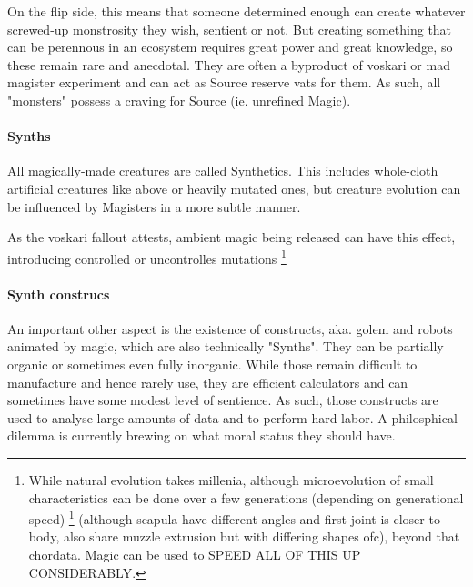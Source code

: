 On the flip side, this means that someone determined enough can create whatever screwed-up monstrosity they wish, sentient or not. But creating something that can be perennous in an ecosystem requires great power and great knowledge, so these remain rare and anecdotal. They are often a byproduct of voskari or mad magister experiment and can act as Source reserve vats for them. As such, all "monsters" possess a craving for Source (ie. unrefined Magic).



\paragraph{Synths}





All magically-made creatures are called Synthetics. This includes whole-cloth artificial creatures like above or heavily mutated ones, but creature evolution can be influenced by Magisters in a more subtle manner.


As the voskari fallout attests, ambient magic being released can have this effect, introducing controlled or uncontrolles mutations \footnote{While natural evolution takes millenia, although microevolution of small characteristics can be done over a few generations (depending on generational speed)
\footnote{Quadrupeds will generally share a bone structure and muscle attachments, traces of which can be seen in fish even. Muscle attachments for the face are cheekbones and lower far mandible} (although scapula have different angles and first joint is closer to body, also share muzzle extrusion but with differing shapes ofc), beyond that chordata. Magic can be used to SPEED ALL OF THIS UP CONSIDERABLY.}


\paragraph{Synth construcs}

An important other aspect is the existence of constructs, aka. golem and robots animated by magic, which are also technically "Synths". They can be partially organic or sometimes even fully inorganic. While those remain difficult to manufacture and hence rarely use, they are efficient calculators and can sometimes have some modest level of sentience. As such, those constructs are used to analyse large amounts of data and to perform hard labor. A philosphical dilemma is currently brewing on what moral status they should have.

